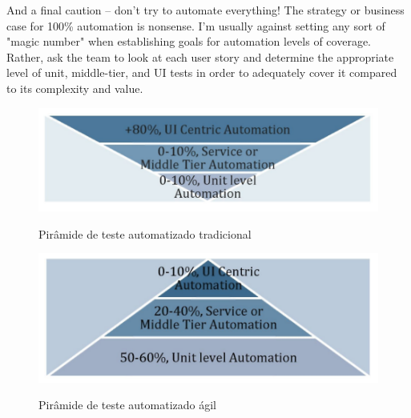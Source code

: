 \documentclass[
	12pt,				%
	openright,			%
	oneside,			%
	a4paper,			%
	english,			%
	brazil,				%
	]{abntex2}
\begin{document}
And a final caution – don't try to automate everything! The strategy or business case for 100\% automation is nonsense. I'm usually against setting any sort of "magic number" when establishing goals for automation levels of coverage. Rather, ask the team to look at each user story and determine the appropriate level of unit, middle-tier, and UI tests in order to adequately cover it compared to its complexity and value.

\begin{figure}[H]
    \centering
    \caption{Pirâmide de teste automatizado tradicional}
    \graphicspath{ {./graphics/agile/} }
    \includegraphics[scale=1.0]{testing-pyramid-traditional}
    \label{fig:testing-pyramid-traditional}
\end{figure}

\begin{figure}[H]
    \centering
    \caption{Pirâmide de teste automatizado ágil}
    \graphicspath{ {./graphics/agile/} }
    \includegraphics[scale=1.0]{testing-pyramid-agile}
    \label{fig:testing-pyramid-agile}
\end{figure}
\end{document}
